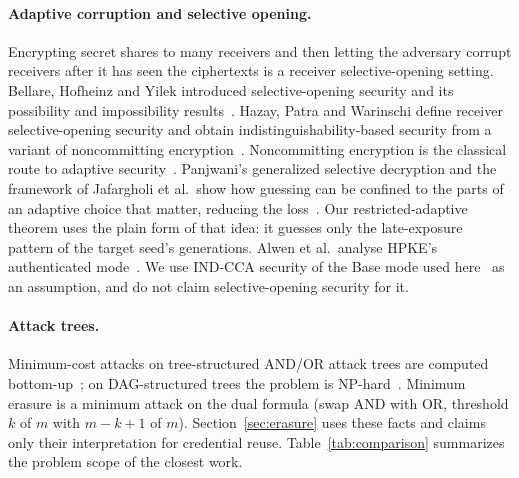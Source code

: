 \documentclass[pdflatex,sn-mathphys-num,twocolumn]{sn-jnl}
\theoremstyle{plain}
\theoremstyle{definition}
\begin{document}
\paragraph{Adaptive corruption and selective opening.}
Encrypting secret shares to many receivers and then letting the adversary corrupt receivers after it has seen the ciphertexts is a receiver selective-opening setting. Bellare, Hofheinz and Yilek introduced selective-opening security and its possibility and impossibility results~\cite{bellare2009}. Hazay, Patra and Warinschi define receiver selective-opening security and obtain indistinguishability-based security from a variant of noncommitting encryption~\cite{hazay2015}. Noncommitting encryption is the classical route to adaptive security~\cite{canetti1996}. Panjwani's generalized selective decryption and the framework of Jafargholi et al.\ show how guessing can be confined to the parts of an adaptive choice that matter, reducing the loss~\cite{panjwani2007,jafargholi2017}. Our restricted-adaptive theorem uses the plain form of that idea: it guesses only the late-exposure pattern of the target seed's generations. Alwen et al.\ analyse HPKE's authenticated mode~\cite{alwen2021}. We use IND-CCA security of the Base mode used here~\cite{rfc9180} as an assumption, and do not claim selective-opening security for it.

\paragraph{Attack trees.}
Minimum-cost attacks on tree-structured AND/OR attack trees are computed bottom-up~\cite{mauw2005}; on DAG-structured trees the problem is NP-hard~\cite{lopuhaa2022}. Minimum erasure is a minimum attack on the dual formula (swap AND with OR, threshold $k$ of $m$ with $m-k+1$ of $m$). Section~\ref{sec:erasure} uses these facts and claims only their interpretation for credential reuse. Table~\ref{tab:comparison} summarizes the problem scope of the closest work.
\end{document}
